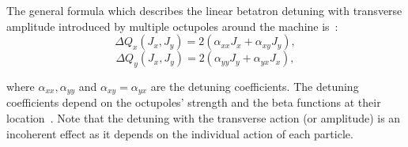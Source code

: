The general formula which describes the linear betatron detuning with transverse amplitude introduced by multiple octupoles around the machine is~\cite{Gareyte:321824}:
\begin{equation}\label{eq:DQ_with_amplitude_horizontal}
    \Delta Q_x (J_x, J_y) = 2(\alpha_{xx} J_x + \alpha_{xy}J_y),
\end{equation}
\begin{equation}\label{eq:DQ_with_amplitude_vertical}
    \Delta Q_y (J_x, J_y) = 2(\alpha_{yy} J_y + \alpha_{yx}J_x),
\end{equation}

where $\alpha_{xx}, \alpha_{yy}$ and $\alpha_{xy}=\alpha_{yx}$ are the detuning coefficients. The detuning coefficients depend on the octupoles' strength and the beta functions at their location~\cite{Gareyte:321824}. Note that the detuning with the transverse action (or amplitude) is an incoherent effect as it depends on the individual action of each particle.








